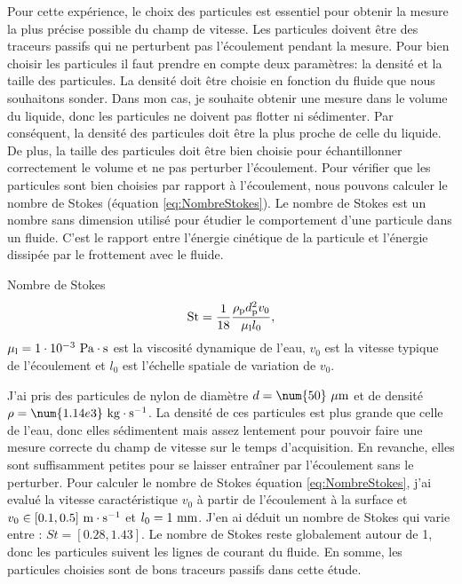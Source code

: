 \documentclass[french, 10pt]{article}
\begin{document}
Pour cette expérience, le choix des particules est essentiel pour obtenir la mesure la plus précise possible du champ de vitesse. Les particules doivent être des traceurs passifs qui ne perturbent pas l'écoulement pendant la mesure. Pour bien choisir les particules il faut prendre en compte deux paramètres: la densité et la taille des particules. La densité doit être choisie en fonction du fluide que nous souhaitons sonder. Dans mon cas, je souhaite obtenir une mesure dans le volume du liquide, donc les particules ne doivent pas flotter ni sédimenter. Par conséquent, la densité des particules doit être la plus proche de celle du liquide. De plus, la taille des particules doit être bien choisie pour échantillonner correctement le volume et ne pas perturber l'écoulement. Pour vérifier que les particules sont bien choisies par rapport à l'écoulement, nous pouvons calculer le nombre de Stokes (équation \ref{eq:NombreStokes}). Le nombre de Stokes est un nombre sans dimension utilisé pour étudier le comportement d'une particule dans un fluide. C'est le rapport entre l'énergie cinétique de la particule et l'énergie dissipée par le frottement avec le fluide.


\begin{Programme}{Nombre de Stokes}
    \begin{equation}
      \mathrm{St} = \frac{1}{18}\frac{\rho_{\rm p}d_{\rm p}^2v_0}{\mu_{\rm l}l_0},\label{eq:NombreStokes}
    \end{equation}
    $\mu_{\rm l} = 1\cdot 10^{-3}~\rm Pa\cdot s$ est la viscosité dynamique de l'eau, $v_0$ est la vitesse typique de l'écoulement et $l_0$ est l'échelle spatiale de variation de $v_0$.
\end{Programme}



J'ai pris des particules de nylon de diamètre $d=\num{50}\rm~ \mu m$ et de densité $\rho = \num{1.14e3}~\rm kg\cdot s^{-1}$. La densité de ces particules est plus grande que celle de l'eau, donc elles sédimentent mais assez lentement pour pouvoir faire une mesure correcte du champ de vitesse sur le temps d'acquisition. En revanche, elles sont suffisamment petites pour se laisser entraîner par l'écoulement sans le perturber. Pour calculer le nombre de Stokes équation \eqref{eq:NombreStokes}, j'ai evalué la vitesse caractéristique $v_0$ à partir de l'écoulement à la surface et $v_0 \in [0.1, 0.5]~\rm m\cdot s^{-1}$ et $l_0 = 1\rm~  mm$. J'en ai déduit un nombre de Stokes qui varie entre : $St = [0.28, 1.43]$. Le nombre de Stokes reste globalement autour de 1, donc les particules suivent les lignes de courant du fluide. En somme, les particules choisies sont de bons traceurs passifs dans cette étude.
\end{document}
